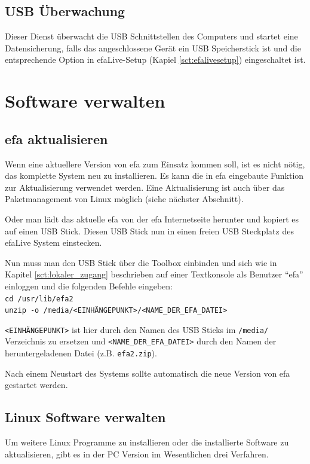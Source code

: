 \documentclass[a4paper,12pt,twoside]{article}
\begin{document}
\subsection{USB Überwachung}
\label{sct:usb_monitor}
Dieser Dienst überwacht die USB Schnittstellen des Computers und startet
eine Datensicherung, falls das angeschlossene Gerät ein USB Speicherstick
ist und die entsprechende Option in efaLive-Setup (Kapiel \ref{sct:efalivesetup})
eingeschaltet ist.


\section{Software verwalten}
\label{sct:software_verwalten}
\subsection{efa aktualisieren}
\label{update_efa}
Wenn eine aktuellere Version von efa zum Einsatz kommen soll, ist es
nicht nötig, das komplette System neu zu installieren. Es kann die in
efa eingebaute Funktion zur Aktualisierung verwendet werden. Eine 
Aktualisierung ist auch über das Paketmanagement von Linux möglich (siehe
nächster Abschnitt).

Oder man lädt das aktuelle efa von der efa Internetseite \cite{EFA1}
herunter und kopiert es auf einen USB Stick. Diesen USB Stick nun in
einen freien USB Steckplatz des efaLive System einstecken. 

Nun muss man den USB Stick über die Toolbox einbinden und sich wie in
Kapitel \ref{sct:lokaler_zugang} beschrieben auf einer Textkonsole als Benutzer
"`efa"' einloggen und die folgenden Befehle eingeben:
\bigskip
\\
\texttt{cd /usr/lib/efa2\\
unzip -o /media/{\textless}EINHÄNGEPUNKT{\textgreater}/{\textless}NAME\_DER\_EFA\_DATEI{\textgreater}}

\bigskip
\texttt{{\textless}EINHÄNGEPUNKT{\textgreater}} ist hier durch den Namen des USB
Sticks im \texttt{/media/} Verzeichnis zu ersetzen und \texttt{{\textless}NAME\_DER\_EFA\_DATEI{\textgreater}} 
durch den Namen der heruntergeladenen Datei (z.B. \texttt{efa2.zip}).

Nach einem Neustart des Systems sollte automatisch die neue Version von
efa gestartet werden.


\subsection{Linux Software verwalten}
\label{sct:linux_software}
Um weitere Linux Programme zu installieren oder die installierte
Software zu aktualisieren, gibt es in der PC Version im Wesentlichen
drei Verfahren. 
\end{document}
